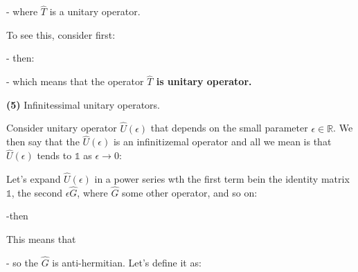 \documentclass{article}
\begin{document}
- where $\hat{T}$ is a unitary operator.

To see this, consider first:



- then:


- which means that the operator \textbf{$\hat{T}$ is unitary operator.}


\textbf{(5)} Infinitessimal unitary operators.

Consider unitary operator $\hat{U}(\epsilon)$ that depends on the small parameter $\epsilon \in \mathbb{R}$. We then say that the $\hat{U}(\epsilon)$ is an infinitizemal operator and all we mean is that $\hat{U}(\epsilon)$ tends to $\mathbb{1}$ as $\epsilon \rightarrow 0$:


Let's expand $\hat{U}(\epsilon)$ in a power series wth the first term bein the identity matrix $\mathbb{1}$, the second $\epsilon \hat{G}$, where $\hat{G}$ some other operator, and so on:


-then


This means that


- so the $\hat{G}$ is anti-hermitian. Let's define it as:

\end{document}
